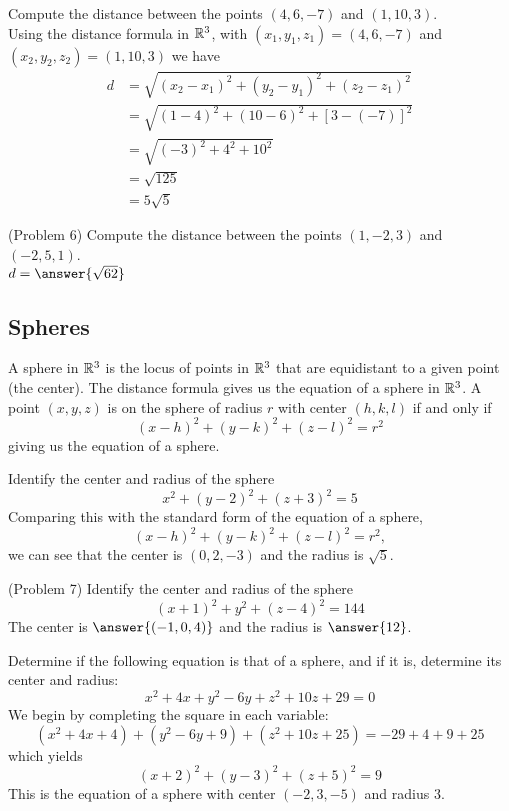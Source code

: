 \documentclass[handout]{ximera}
\begin{document}

\begin{example}[Example 6]
Compute the distance between the points $(4, 6, -7)$ and $(1,10, 3)$.\\
Using the distance formula in $\mathbb R^3$, with $(x_1, y_1, z_1) = (4,6,-7)$ and $(x_2, y_2, z_2) = (1,10,3)$ we have
\begin{align*}
d &= \sqrt{(x_2 -x_1)^2+(y_2 -y_1)^2+(z_2 -z_1)^2}\\
  &= \sqrt{(1-4)^2+(10-6 )^2+[3-(-7)]^2}\\
  &= \sqrt{(-3)^2 + 4^2 +10^2}\\
  &= \sqrt{125}\\
  &= 5\sqrt 5
\end{align*}

\end{example}
\begin{problem}(Problem 6) 
Compute the distance between the points $(1, -2, 3)$ and $(-2, 5, 1)$.\\
$d = \answer{\sqrt{62}}$
\end{problem}

\subsection{Spheres}
A sphere in $\mathbb R^3$ is the locus of points in $\mathbb R^3$ that are equidistant to a given point (the center).
The distance formula gives us the equation of a sphere in $\mathbb R^3$.  A point $(x, y, z)$ is on the sphere of radius $r$ with center $(h, k, l)$
if and only if
\[
(x-h)^2 + (y-k)^2 + (z -l)^2 = r^2
\]
giving us the equation of a sphere.

\begin{example}[Example 7]
Identify the center and radius of the sphere 
\[
x^2 + (y-2)^2 + (z+3)^2 = 5
\]
Comparing this with the standard form of the equation of a sphere,
\[
(x-h)^2 + (y-k)^2 + (z -l)^2 = r^2,
\]
we can see that the center is $(0, 2, -3)$ and the radius is $\sqrt 5$.
\end{example}

\begin{problem}(Problem 7)
Identify the center and radius of the sphere 
\[
(x+1)^2 + y^2 + (z-4)^2 = 144
\]
The center is $\answer{(-1, 0, 4)}$ and the radius is $\answer{12}$.
\end{problem}


\begin{example}[Example 8]
Determine if the following equation is that of a sphere, and if it is, determine its center and radius:
\[
x^2 + 4x + y^2 - 6y + z^2 + 10z + 29 = 0
\]
We begin by completing the square in each variable:
\[
(x^2 + 4x + 4) + (y^2 - 6y + 9) + (z^2 + 10z + 25) =-29 + 4 + 9 + 25
\]
which yields
\[
(x+2)^2 +(y-3)^2 + (z+5)^2 = 9
\]
This is the equation of a sphere with center $(-2, 3, -5)$ and radius $3$. 
\end{example}
\end{document}

